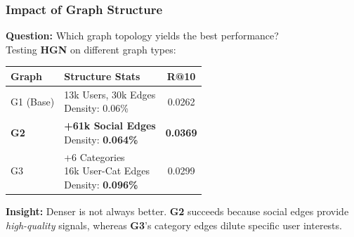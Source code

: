 \documentclass{beamer}
\begin{document}
\begin{frame}
    \frametitle{Impact of Graph Structure}
    \textbf{Question:} Which graph topology yields the best performance?\\
    Testing \textbf{HGN} on different graph types:

    \vspace{0.3cm}
    \begin{table}
        \centering
        \scriptsize
        \begin{tabular}{l|l|c}
            \toprule
            \textbf{Graph} & \textbf{Structure Stats}                  & \textbf{R@10} \\
            \midrule
            G1 (Base)      & \parbox{3.5cm}{13k Users, 30k Edges                       \\ Density: 0.06\%}               & 0.0262          \\
            \midrule
            \textbf{G2}    & \parbox{3.5cm}{\textbf{+61k Social Edges}                 \\ Density: \textbf{0.064\%}} & \textbf{0.0369} \\
            \midrule
            G3             & \parbox{3.5cm}{+6 Categories                              \\ 16k User-Cat Edges \\ Density: \textbf{0.096\%}}                   & 0.0299          \\
            \bottomrule
        \end{tabular}
    \end{table}

    \textbf{Insight:} Denser is not always better. \textbf{G2} succeeds because social edges provide \textit{high-quality} signals, whereas \textbf{G3}'s category edges dilute specific user interests.


    \vspace{0.2cm}


\end{frame}
\end{document}
